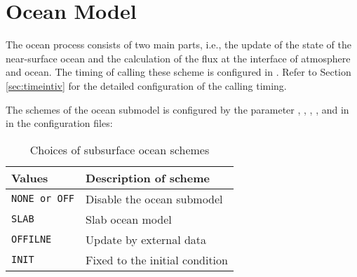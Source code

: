 \section{Ocean Model} \label{sec:basic_usel_ocean}
The ocean process consists of two main parts, i.e., the update of the state of the near-surface ocean and the calculation of the flux at the interface of atmosphere and ocean.
The timing of calling these scheme is configured in . Refer to Section \ref{sec:timeintiv} for the detailed configuration of the calling timing.

The schemes of the ocean submodel is configured by the parameter , , , , and  in  in the configuration files:


\begin{table}[h]
\begin{center}
  \caption{Choices of subsurface ocean schemes}
  \label{tab:nml_ocean_dyn}
  \begin{tabularx}{150mm}{lX} \hline
    \rowcolor[gray]{0.9}  Values & Description of scheme \\ \hline
      \verb|NONE or OFF| & Disable the ocean submodel \\
      \verb|SLAB|        & Slab ocean model \\
      \verb|OFFILNE|     & Update by external data \\
      \verb|INIT|        & Fixed to the initial condition \\
    \hline
  \end{tabularx}
\end{center}
\end{table}

